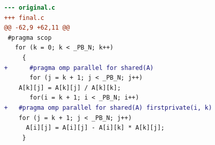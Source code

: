 \begin{lstlisting}[language=diff,basicstyle=\ttfamily\scriptsize,breaklines=true,caption={polybench/lu — parallel-not-faster (e10)}]
--- original.c
+++ final.c
@@ -62,9 +62,11 @@
 #pragma scop
   for (k = 0; k < _PB_N; k++)
     {
+      #pragma omp parallel for shared(A)
       for (j = k + 1; j < _PB_N; j++)
 	A[k][j] = A[k][j] / A[k][k];
       for(i = k + 1; i < _PB_N; i++)
+	#pragma omp parallel for shared(A) firstprivate(i, k)
 	for (j = k + 1; j < _PB_N; j++)
 	  A[i][j] = A[i][j] - A[i][k] * A[k][j];
     }
\end{lstlisting}
